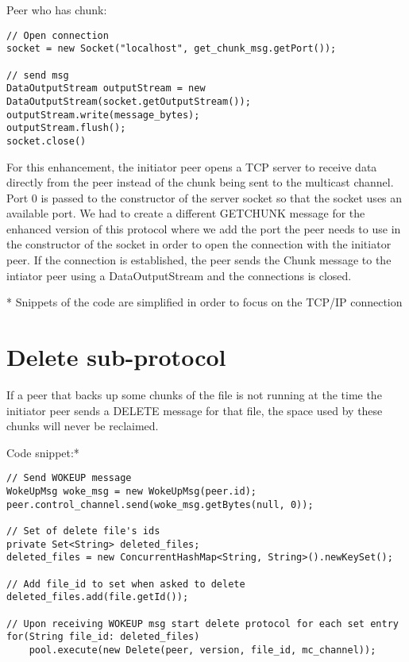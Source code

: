 \documentclass[11pt]{report}
\begin{document}
Peer who has chunk:

\begin{verbatim}
// Open connection
socket = new Socket("localhost", get_chunk_msg.getPort());

// send msg
DataOutputStream outputStream = new DataOutputStream(socket.getOutputStream());
outputStream.write(message_bytes);
outputStream.flush();
socket.close()
\end{verbatim}

For this enhancement, the initiator peer opens a TCP server to receive data directly from the peer instead of the chunk being sent to the multicast channel. Port 0 is passed to the constructor of the server socket so that the socket uses an available port. 
We had to create a different GETCHUNK message for the enhanced version of this protocol where we add the port the peer needs to use in the constructor of the socket in order to open the connection with the initiator peer. If the connection is established, the peer sends the Chunk message to the intiator peer using a DataOutputStream and the connections is closed.

* Snippets of the code are simplified in order to focus on the TCP/IP connection

\newpage

\section{Delete sub-protocol}

If a peer that backs up some chunks of the file is not running at the time the initiator peer sends a DELETE message for that file, the space used by these chunks will never be reclaimed.

Code snippet:*

\begin{verbatim} 
// Send WOKEUP message
WokeUpMsg woke_msg = new WokeUpMsg(peer.id);
peer.control_channel.send(woke_msg.getBytes(null, 0));

// Set of delete file's ids
private Set<String> deleted_files;
deleted_files = new ConcurrentHashMap<String, String>().newKeySet();

// Add file_id to set when asked to delete
deleted_files.add(file.getId());

// Upon receiving WOKEUP msg start delete protocol for each set entry
for(String file_id: deleted_files)
    pool.execute(new Delete(peer, version, file_id, mc_channel));
\end{verbatim} 
\end{document}
